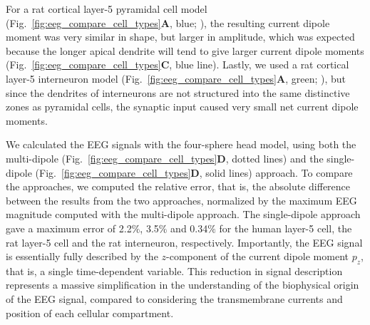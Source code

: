 \documentclass[preprint,10pt,authoryear]{elsarticle}
\begin{document}
For a rat cortical layer-5 pyramidal cell model (Fig.~\ref{fig:eeg_compare_cell_types}\textbf{A}, blue; \cite{HAY2011}), the resulting current dipole moment was very similar in shape, but larger in amplitude, which was expected because the longer apical dendrite will tend to give larger current dipole moments (Fig.~\ref{fig:eeg_compare_cell_types}\textbf{C}, blue line).
Lastly, we used a rat cortical layer-5 interneuron model (Fig.~\ref{fig:eeg_compare_cell_types}\textbf{A}, green; \cite{MARKRAM2015}), but since the dendrites of interneurons are not structured into the same distinctive zones as pyramidal cells, the synaptic input caused very small net current dipole moments.

We calculated the EEG signals with the four-sphere head model, using both the multi-dipole (Fig.~\ref{fig:eeg_compare_cell_types}\textbf{D}, dotted lines) and the single-dipole (Fig.~\ref{fig:eeg_compare_cell_types}\textbf{D}, solid lines) approach.
To compare the approaches, we computed the relative error, that is, the absolute difference between the results from the two approaches, normalized by the maximum EEG magnitude computed with the multi-dipole approach.
The single-dipole approach gave a maximum 
error of  2.2$\%$, 3.5$\%$ and 0.34$\%$ for the human layer-5 cell, the rat layer-5 cell and the rat interneuron, respectively.
Importantly, the EEG signal is essentially fully described by the $z$-component of the current dipole moment $p_z$, that is, a single time-dependent variable. This reduction in signal description represents a massive simplification in the understanding of the biophysical origin of the EEG signal, compared to considering the transmembrane currents and position of each cellular compartment. 
\end{document}

